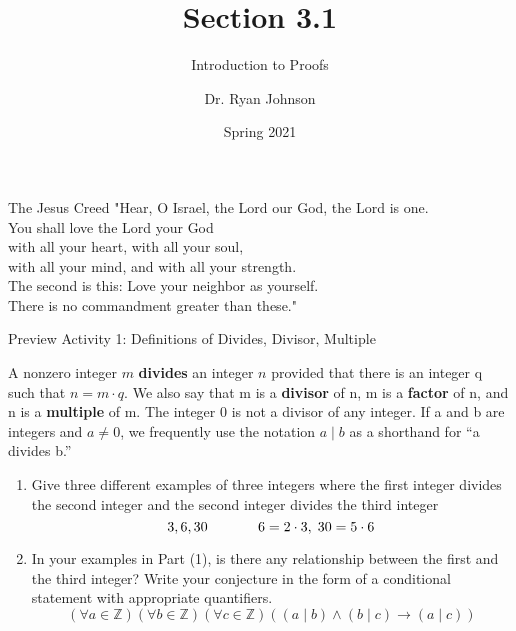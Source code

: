 \documentclass{beamer}
\title{Section 3.1}
\subtitle{Introduction to Proofs}
\author{Dr. Ryan Johnson}
\institute{Grace College}
\date{Spring 2021}
\begin{document}
\begin{frame}[plain]
    \maketitle
\end{frame}

\begin{frame}{The Jesus Creed}
\Large{
"Hear, O Israel, the Lord our God, the Lord is one.\\
You shall love the Lord your God\\
\;\; with all your heart, with all your soul,\\
\;\; with all your mind, and with all your strength.\\
The second is this: Love your neighbor as yourself.\\
There is no commandment greater than these."
}
\end{frame}

\begin{frame}{Preview Activity 1: Definitions of Divides, Divisor, Multiple}
\begin{definition}
	A nonzero integer $m$ \textbf{divides} an integer $n$ provided that there is
	an integer q such that $n = m \cdot q$. We also say that m is a \textbf{divisor} of n, m is
	a \textbf{factor} of n, and n is a \textbf{multiple} of m. The integer 0 is not a divisor of any
	integer. If a and b are integers and $a \neq 0$, we frequently use the notation $a \; | \; b$
	as a shorthand for ``a divides b.''
\end{definition}
\begin{enumerate}
	\item Give three different examples of three integers where the first integer divides the second integer and the second integer divides the third integer\pause
	\[3, 6, 30 \hspace{.5 in} 6 = 2 \cdot 3,\; 30 = 5 \cdot 6 \] \pause \vspace{-.1 in}
	\item In your examples in Part (1), is there any relationship between the first and the third integer?  Write your conjecture in the form of a conditional statement with appropriate quantifiers. \pause
	\[
		(\forall a \in \mathbb{Z})(\forall b \in \mathbb{Z})(\forall c \in \mathbb{Z})((a\;|\;b) \wedge (b\;|\;c) \to (a \;|\; c))
	\]
\end{enumerate}
\end{frame}
\end{document}
